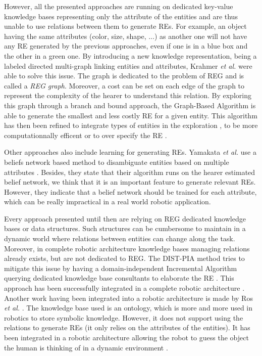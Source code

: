 \documentclass[a4paper,11pt,twoside]{StyleThese}
\begin{document}
However, all the presented approaches are running on dedicated key-value knowledge bases representing only the attribute of the entities and are thus unable to use relations between them to generate REs. For example, an object having the same attributes (color, size, shape, ...) as another one will not have any RE generated by the previous approaches, even if one is in a blue box and the other in a green one. By introducing a new knowledge representation, being a labeled directed multi-graph linking entities and attributes, Krahmer \textit{et al.} were able to solve this issue. The graph is dedicated to the problem of REG and is called a \textit{REG graph}. Moreover, a cost can be set on each edge of the graph to represent the complexity of the hearer to understand this relation. By exploring this graph through a branch and bound approach, the Graph-Based Algorithm \cite{krahmer2003graph} is able to generate the smallest and less costly RE for a given entity. This algorithm has then been refined to integrate types of entities in the exploration \cite{krahmer2012computational}, to be more computationnally efficent \cite{li2017automatically} or to over specify the RE \cite{viethen2013graphs}.

Other approaches also include learning for generating REs. Yamakata \textit{et al.} use a beliefs network based method to disambiguate entities based on multiple attributes \cite{yamakata2004belief}. Besides, they state that their algorithm runs on the hearer estimated belief network, we think that it is an important feature to generate relevant REs. However, they indicate that a belief network should be trained for each attribute, which can be really impractical in a real world robotic application.

Every approach presented until then are relying on REG dedicated knowledge bases or data structures. Such structures can be cumbersome to maintain in a dynamic world where relations between entities can change along the task. Moreover, in complete robotic architecture knowledge bases managing relations already exists, but are not dedicated to REG. The DIST-PIA method tries to mitigate this issue by having a domain-independent Incremental Algorithm querying dedicated knowledge base consultants to elaborate the RE \cite{williams2017referring}. This approach has been successfully integrated in a complete robotic architecture \cite{williams2019dempster}. Another work having been integrated into a robotic architecture is made by Ros \textit{et al.} \cite{ros2010one}. The knowledge base used is an ontology, which is more and more used in robotics to store symbolic knowledge. However, it does not support using the relations to generate REs (it only relies on the attributes of the entities). It has been integrated in a robotic architecture allowing the robot to guess the object the human is thinking of in a dynamic environment \cite{lemaignan2012grounding}.
\end{document}
